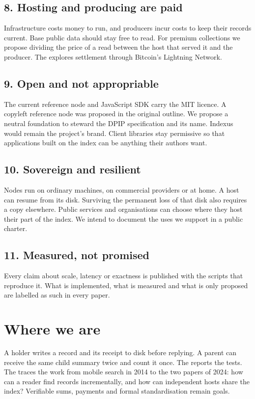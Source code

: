 \documentclass[11pt]{article}
\begin{document}
\subsection*{8. Hosting and producing are paid}
Infrastructure costs money to run, and producers incur costs to keep their records current. Base public data should stay free to read. For premium collections we propose dividing the price of a read between the host that served it and the producer. The  explores settlement through Bitcoin's Lightning Network.

\subsection*{9. Open and not appropriable}
The current reference node and JavaScript SDK carry the MIT licence. A copyleft reference node was proposed in the original outline. We propose a neutral foundation to steward the DPIP specification and its name. Indexus would remain the project's brand. Client libraries stay permissive so that applications built on the index can be anything their authors want.

\subsection*{10. Sovereign and resilient}
Nodes run on ordinary machines, on commercial providers or at home. A host can resume from its disk. Surviving the permanent loss of that disk also requires a copy elsewhere. Public services and organisations can choose where they host their part of the index. We intend to document the uses we support in a public charter.

\subsection*{11. Measured, not promised}
Every claim about scale, latency or exactness is published with the scripts that reproduce it. What is implemented, what is measured and what is only proposed are labelled as such in every paper.

\section*{Where we are}
A holder writes a record and its receipt to disk before replying. A parent can receive the same child summary twice and count it once. The  reports the tests. The  traces the work from mobile search in 2014 to the two papers of 2024: how can a reader find records incrementally, and how can independent hosts share the index? Verifiable sums, payments and formal standardisation remain goals.
\end{document}
